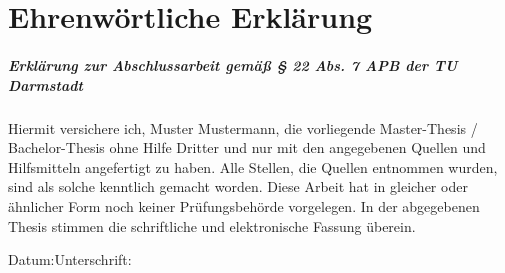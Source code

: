 	\chapter*{Ehrenwörtliche Erklärung}
	\vspace{11pt}
	\paragraph{Erklärung zur Abschlussarbeit gemäß § 22 Abs. 7 APB der TU Darmstadt}
	\vspace{11pt}
	\noindent Hiermit versichere ich, Muster Mustermann, die vorliegende Master-Thesis / Bachelor-Thesis ohne Hilfe Dritter und nur mit den angegebenen Quellen und Hilfsmitteln angefertigt zu haben. Alle Stellen, die Quellen entnommen wurden, sind als solche kenntlich gemacht worden. Diese Arbeit hat in gleicher oder ähnlicher Form noch keiner Prüfungsbehörde vorgelegen. \newline
	In der abgegebenen Thesis stimmen die schriftliche und elektronische Fassung überein.\vspace{40pt}
	
	\noindent Datum:\hspace{0.4\textwidth}Unterschrift:
	\vspace*{2cm}	